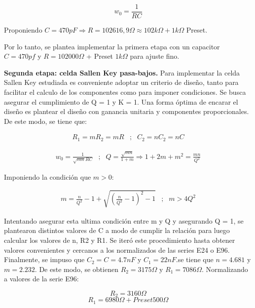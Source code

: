 $$w_{0} = \frac{1}{RC}$$

Proponiendo $C = 470pF \Rightarrow R = 102616,9 \Omega \approx 102k \Omega + 1k \Omega$ Preset.

Por lo tanto, se plantea implementar la primera etapa con un capacitor $C = 470 pf$ y $R = 102000 \Omega$ + Preset $1k\Omega$ para ajuste fino. 


\textbf{Segunda etapa: celda Sallen Key pasa-bajos.} Para implementar la celda Sallen Key estudiada es conveniente adoptar un criterio de diseño, tanto para facilitar el calculo de los componentes como para imponer condiciones. Se busca asegurar el cumplimiento de Q = 1 y K = 1. Una forma óptima de encarar el diseño es plantear el diseño con ganancia unitaria y componentes proporcionales. De este modo, se tiene que:

\begin{equation}
\begin{matrix}
R_{1} = mR_{2} = mR & ; & C_{2} = nC_{2} = nC
\end{matrix}
    \label{eq:SK13}
\end{equation}

\begin{equation}
\begin{matrix}
w_{0} = \frac{1}{\sqrt{mn}RC} & ; & Q = \frac{\sqrt{mn}}{1+m} \Rightarrow  1 + 2m + m^{2} = \frac{mn}{Q^{2}}
\end{matrix}
    \label{eq:SK14}
\end{equation}

Imponiendo la condición que $m > 0$:

\begin{equation}
\begin{matrix}
m = \frac{n}{Q^{2}} - 1 + \sqrt{(\frac{n}{Q^{2}} - 1)^{2} - 1} & ; & m > 4Q^{2}
\end{matrix}
    \label{eq:SK14}
\end{equation}

Intentando asegurar esta ultima condición entre m y Q y asegurando Q = 1, se plantearon distintos valores de C a modo de cumplir la relación para luego calcular los valores de n, R2 y R1. Se iteró este procedimiento hasta obtener valores convenientes y cercanos a los normalizados de las series E24 o E96. Finalmente, se impuso que $C_{2} = C = 4.7nF$ y $C_{1} = 22nF$.se tiene que $n = 4.681$ y $m = 2.232$. De este modo, se obtienen $R_{2} = 3175 \Omega$ y $R_{1} = 7086 \Omega$. Normalizando a valores de la serie E96:

$$R_{2} = 3160 \Omega$$
$$R_{1} = 6980 \Omega + Preset 500 \Omega$$

